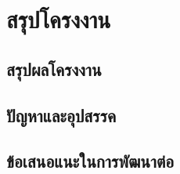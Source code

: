 \chapter{สรุปโครงงาน}
\label{chapter5}

\section{สรุปผลโครงงาน}

\section{ปัญหาและอุปสรรค}

\section{ข้อเสนอแนะในการพัฒนาต่อ}

